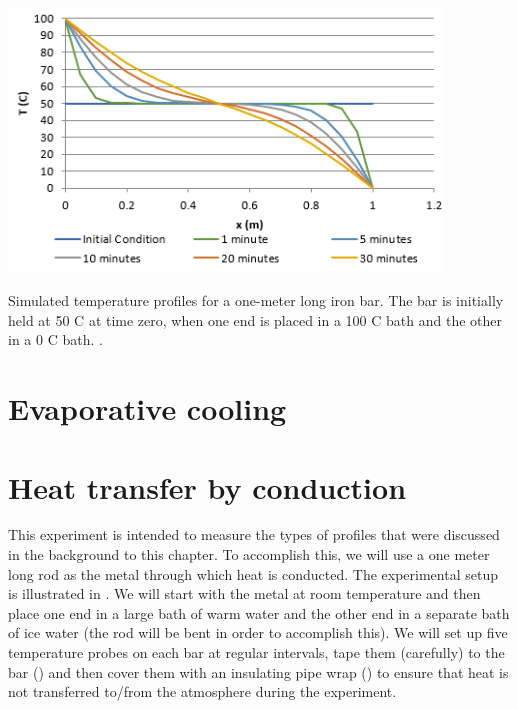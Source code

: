 \begin{marginfigure}[-3cm]
	\begin{center}
		\includegraphics[height=7cm]{Images/diffusionplot.png}
		\caption[Numerical Solution to Diffusion Equation]{Simulated temperature profiles for a one-meter long iron bar.  The bar is initially held at 50 \textdegree C at time zero, when one end is placed in a 100 \textdegree C bath and the other in a 0 \textdegree C bath.  .}
	\end{center}
\end{marginfigure}

\section{\color{gray} Evaporative cooling \color{black}}
\section{Heat transfer by conduction}

This experiment is intended to measure the types of profiles that were discussed in the background to this chapter.  To accomplish this, we will use a one meter long rod as the metal through which heat is conducted. The experimental setup is illustrated in .  We will start with the metal at room temperature and then place one end in a large bath of warm water and the other end in a separate bath of ice water (the rod will be bent in order to accomplish this).  We will set up five temperature probes on each bar at regular intervals, tape them (carefully) to the bar () and then cover them with an insulating pipe wrap () to ensure that heat is not transferred to/from the atmosphere during the experiment.

